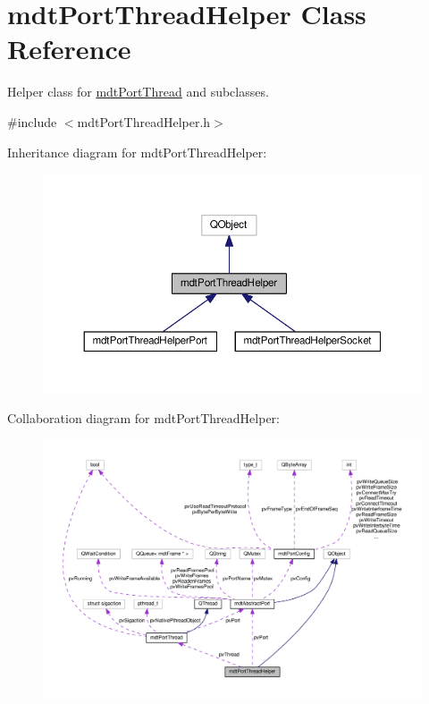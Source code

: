 \hypertarget{classmdt_port_thread_helper}{\section{mdt\-Port\-Thread\-Helper Class Reference}
\label{classmdt_port_thread_helper}
}


Helper class for \hyperlink{classmdt_port_thread}{mdt\-Port\-Thread} and subclasses.  




{\ttfamily \#include $<$mdt\-Port\-Thread\-Helper.\-h$>$}



Inheritance diagram for mdt\-Port\-Thread\-Helper\-:\nopagebreak
\begin{figure}[H]
\begin{center}
\leavevmode
\includegraphics[width=350pt]{classmdt_port_thread_helper__inherit__graph}
\end{center}
\end{figure}


Collaboration diagram for mdt\-Port\-Thread\-Helper\-:\nopagebreak
\begin{figure}[H]
\begin{center}
\leavevmode
\includegraphics[width=350pt]{classmdt_port_thread_helper__coll__graph}
\end{center}
\end{figure}
